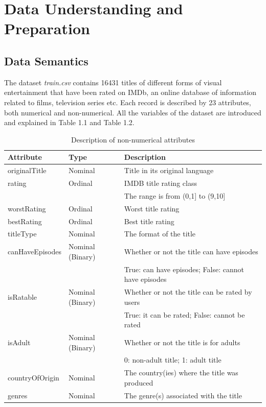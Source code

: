 \chapter{Data Understanding and Preparation}
\label{ch:capitolo1}

\section{Data Semantics}\label{sec:data_semantics}
The dataset \textit{train.csv} contains 16431 titles of different forms of visual entertainment that have been rated on IMDb, an online database of information related to films, television series etc. 
Each record is described by 23 attributes, both numerical and non-numerical. 
All the variables of the dataset are introduced and explained in Table 1.1 and Table 1.2.
\begin{table}[h]
    \centering
    \begin{tabular}{|l|l|l|} %
        \hline
        \textbf{Attribute} & \textbf{Type} & \textbf{Description} \\ 
        \hline
        originalTitle & Nominal & Title in its original language \\  
        \hline
        rating & Ordinal & IMDB title rating class \\
        & & The range is from (0,1] to (9,10] \\ 
        \hline
        worstRating & Ordinal & Worst title rating \\ 
        \hline
        bestRating & Ordinal & Best title rating \\ 
        \hline
        titleType & Nominal & The format of the title \\ 
        \hline
        canHaveEpisodes & Nominal (Binary) & Whether or not the title can have episodes \\ 
        & & True: can have episodes; False: cannot have episodes \\ 
        \hline
        isRatable & Nominal (Binary) & Whether or not the title can be rated by users \\ 
        & & True: it can be rated; False: cannot be rated \\ 
        \hline
        isAdult & Nominal (Binary) & Whether or not the title is for adults \\ 
        & & 0: non-adult title; 1: adult title \\ 
        \hline
        countryOfOrigin & Nominal & The country(ies) where the title was produced \\ 
        \hline
        genres & Nominal & The genre(s) associated with the title \\ 
        \hline
    \end{tabular}
    \caption{Description of non-numerical attributes}
    \label{tab:attributes}
\end{table}
